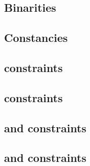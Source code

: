 \subsection{Binarities}                                                                                  \label{rlp auth: generalities: binarities}                                 
\subsection{Constancies}                                                                                 \label{rlp auth: generalities: constancies}                                
\subsection{\iomf{} constraints}                                                                         \label{rlp auth: generalities: iomf}                                       
\subsection{\userTransactionNumber{} constraints}                                                        \label{rlp auth: generalities: user transaction number}                    
\subsection{\transactionTypeWithAuthorityLists{} and \transactionTypeWithAuthorityLists{} constraints}   \label{rlp auth: generalities: transactions with or sans authority list}   
\subsection{\ct{} and \maxCt{} constraints}                                                              \label{rlp auth: generalities: ct and ct_max}                              
